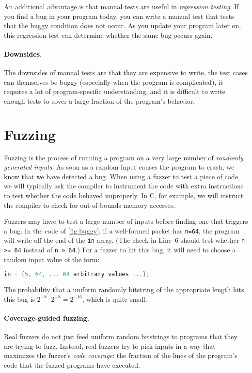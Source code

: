 An additional advantage is that manual tests are useful in \emph{regression testing}:
If you find a bug in your program today, you can write a manual test that
tests that the buggy condition does not occur. As you update your program 
later on, this regression test can determine whether the same bug occurs again.

\paragraph{Downsides.}
The downsides of manual tests are that they are expensive to write, 
the test cases can themselves be buggy (especially when the program is complicated),
it requires a lot of program-specific understanding, 
and it is difficult to write enough tests to cover a large fraction of the
program's behavior.

\section{Fuzzing}

Fuzzing is the process of running a program on a very large
number of \emph{randomly generated inputs}.
As soon as a random input causes the program to crash, we
know that we have detected a bug.
When using a fuzzer to test a piece of code, we will typically
ask the compiler to instrument the code with extra instructions
to test whether the code behaved improperly.
In C, for example, we will instruct the compiler to check
for out-of-bounds memory accesses.

Fuzzers may have to test a large number of inputs before finding
one that triggers a bug.
In the code of \cref{fig:buggy}, if a well-formed packet has \texttt{n=64},
the program will write off the end of the \texttt{in} array.
(The check in Line~6 should test whether \texttt{n >= 64} instead of \texttt{n > 64}.)
For a fuzzer to hit this bug, it will need to choose a random input
value of the form:
\begin{lstlisting}[language=c]
in = {5, 64, ... 64 arbitrary values ...};
\end{lstlisting}

The probability that a uniform randomly bitstring of the appropriate length
hits this bug is $2^{-8} \cdot 2^{-8} = 2^{-16}$, which is quite small.

\paragraph{Coverage-guided fuzzing.}
Real fuzzers do not just feed uniform random bitstrings to programs
that they are trying to fuzz. 
Instead, real fuzzers try to pick inputs in a way that maximizes
the fuzzer's \emph{code coverage}: the fraction of the lines of 
the program's code that the fuzzed programs have executed.

